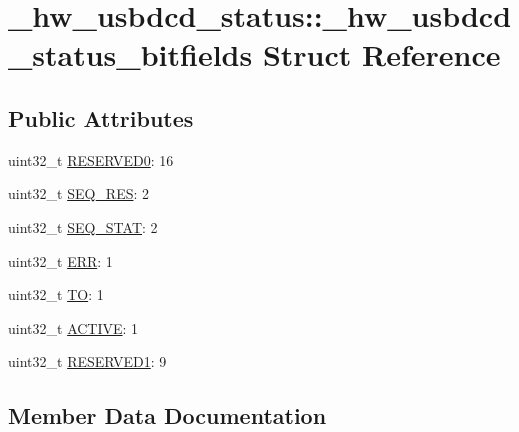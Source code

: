 \hypertarget{struct__hw__usbdcd__status_1_1__hw__usbdcd__status__bitfields}{}\section{\+\_\+hw\+\_\+usbdcd\+\_\+status\+:\+:\+\_\+hw\+\_\+usbdcd\+\_\+status\+\_\+bitfields Struct Reference}
\label{struct__hw__usbdcd__status_1_1__hw__usbdcd__status__bitfields}
\subsection*{Public Attributes}
\begin{DoxyCompactItemize}
\item 
uint32\+\_\+t \hyperlink{struct__hw__usbdcd__status_1_1__hw__usbdcd__status__bitfields_aa23b928ae8376ec6588d1c1b7bb2ad39}{R\+E\+S\+E\+R\+V\+E\+D0}\+: 16
\item 
uint32\+\_\+t \hyperlink{struct__hw__usbdcd__status_1_1__hw__usbdcd__status__bitfields_a8e80c868151e247e5a266f8a2c04c685}{S\+E\+Q\+\_\+\+R\+ES}\+: 2
\item 
uint32\+\_\+t \hyperlink{struct__hw__usbdcd__status_1_1__hw__usbdcd__status__bitfields_a481550c331d3055e989ffdfb68514a6b}{S\+E\+Q\+\_\+\+S\+T\+AT}\+: 2
\item 
uint32\+\_\+t \hyperlink{struct__hw__usbdcd__status_1_1__hw__usbdcd__status__bitfields_ada159ea2f42c6aa9f0d562e46c48499c}{E\+RR}\+: 1
\item 
uint32\+\_\+t \hyperlink{struct__hw__usbdcd__status_1_1__hw__usbdcd__status__bitfields_ac0cea05f7d306db8ba3e3d32b6db58c7}{TO}\+: 1
\item 
uint32\+\_\+t \hyperlink{struct__hw__usbdcd__status_1_1__hw__usbdcd__status__bitfields_ab13d4ca7d5b23f06cc4c2376ab29c5f9}{A\+C\+T\+I\+VE}\+: 1
\item 
uint32\+\_\+t \hyperlink{struct__hw__usbdcd__status_1_1__hw__usbdcd__status__bitfields_afb434d9cb02b92b7c38e02ab716cbe8f}{R\+E\+S\+E\+R\+V\+E\+D1}\+: 9
\end{DoxyCompactItemize}


\subsection{Member Data Documentation}
